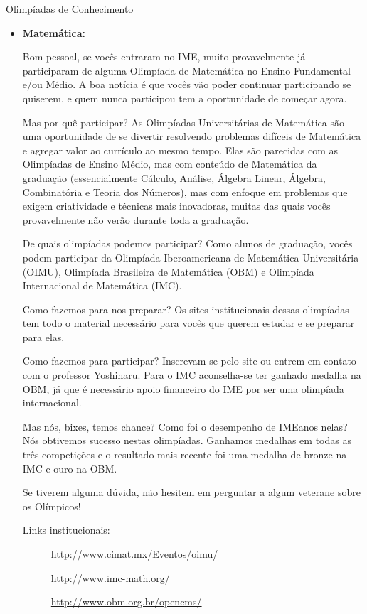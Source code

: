 \begin{subsecao}{Olimpíadas de Conhecimento}

\begin{itemize}

\item{\bf Matemática: }

Bom pessoal, se vocês entraram no IME, muito provavelmente já participaram
de alguma Olimpíada de Matemática no Ensino Fundamental e/ou Médio. A
boa notícia é que vocês vão poder continuar participando se quiserem,
e quem nunca participou tem a oportunidade de começar agora.

Mas por quê participar? As Olimpíadas Universitárias de Matemática são uma
oportunidade de se divertir resolvendo problemas difíceis de Matemática e agregar
valor ao currículo ao mesmo tempo. Elas são parecidas com as Olimpíadas de
Ensino Médio, mas com conteúdo de Matemática da graduação (essencialmente
Cálculo, Análise, Álgebra Linear, Álgebra, Combinatória e Teoria dos Números),
mas com enfoque em problemas que exigem criatividade e técnicas mais inovadoras,
muitas das quais vocês provavelmente não verão durante toda a graduação.

De quais olimpíadas podemos participar? Como alunos de graduação, vocês podem
participar da Olimpíada Iberoamericana de Matemática Universitária (OIMU),
Olimpíada Brasileira de Matemática (OBM) e Olimpíada Internacional de
Matemática (IMC).

Como fazemos para nos preparar? Os sites institucionais dessas olimpíadas
tem todo o material necessário para vocês que querem estudar e se preparar
para elas.

Como fazemos para participar? Inscrevam-se pelo site ou entrem em contato com
o professor Yoshiharu. Para o IMC aconselha-se ter ganhado medalha na OBM,
já que é necessário apoio financeiro do IME por ser uma olimpíada internacional.

Mas nós, bixes, temos chance? Como foi o desempenho de IMEanos nelas? Nós
obtivemos sucesso nestas olimpíadas. Ganhamos medalhas em todas as três
competições e o resultado mais recente foi uma medalha de bronze na IMC e ouro
na OBM.

Se tiverem alguma dúvida, não hesitem em perguntar a algum veterane sobre os
Olímpicos!

Links institucionais:

\begin{description}
  \item[] \url{http://www.cimat.mx/Eventos/oimu/}
  \item[] \url{http://www.imc-math.org/}
  \item[] \url{http://www.obm.org.br/opencms/}
\end{description}


\end{itemize}
\end{subsecao}
